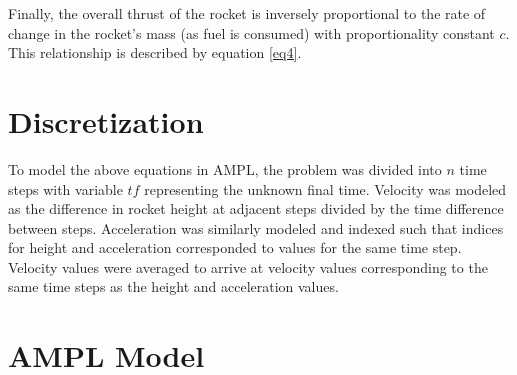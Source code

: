 \documentclass{article}
\begin{document}
Finally, the overall thrust of the rocket is inversely proportional to the rate of change in the rocket's mass (as fuel is consumed) with proportionality constant \(c\). This relationship is described by equation \ref{eq4}.

\section{Discretization}\label{Discretization}

To model the above equations in AMPL, the problem was divided into \(n\) time steps with variable \(tf\) representing the unknown final time. Velocity was modeled as the difference in rocket height at adjacent steps divided by the time difference between steps. Acceleration was similarly modeled and indexed such that indices for height and acceleration corresponded to values for the same time step. Velocity values were averaged to arrive at velocity values corresponding to the same time steps as the height and acceleration values.

\section{AMPL Model}\label{AMPL Model}
\end{document}
